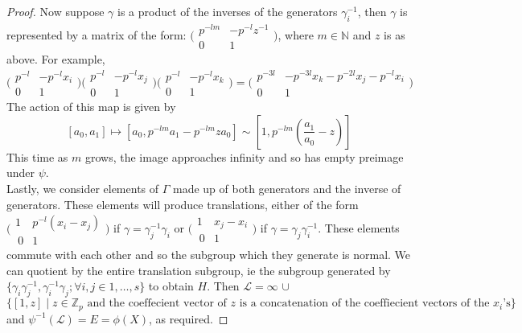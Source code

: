 \begin{proof}
Now suppose $\gamma$ is a product of the inverses of the generators $\gamma_i^{-1}$, then $\gamma$ is represented by a matrix of the form:  $\bigl( \begin{smallmatrix}p^{-lm} & -p^{-l}z^{-1}\\ 0 & 1 \end{smallmatrix}\bigr)$,  where $m \in \mathbb{N}$ and $z$ is as above. For example, 
\[\bigl( \begin{smallmatrix}p^{-l} & -p^{-l}x_i\\ 0 & 1 \end{smallmatrix}\bigr) \bigl( \begin{smallmatrix}p^{-l} & -p^{-l}x_j\\ 0 & 1 \end{smallmatrix}\bigr) \bigl( \begin{smallmatrix}p^{-l} & -p^{-l}x_k\\ 0 & 1 \end{smallmatrix}\bigr) = 
\bigl( \begin{smallmatrix}p^{-3l} & -p^{-3l}x_k - p^{-2l}x_j - p ^{-l}x_i\\ 0 & 1 \end{smallmatrix}\bigr)\]
The action of this map is given by \[[a_0,a_1] \mapsto [a_0, p^{-lm}a_1  -p^{-lm}za_0] \sim [1, p^{-lm}(\frac{a_1}{a_0}- z)]\]
This time as $m$ grows, the image approaches infinity and so has empty preimage under $\psi$.\\

Lastly, we consider elements of $\Gamma$ made up of both generators and the inverse of generators. These elements will produce translations, either of the form  $\bigl( \begin{smallmatrix}1 & p^{-l}(x_i-x_j)\\\ 0 & 1 \end{smallmatrix}\bigr)$ if $\gamma=
 \gamma_j^{-1} \gamma_i$ or $\bigl( \begin{smallmatrix}1 & x_j-x_i\\\ 0 & 1 \end{smallmatrix}\bigr)$ if $\gamma =  \gamma_j \gamma_i^{-1}$.
These elements commute with each other and so the subgroup which they generate is normal. We can quotient by the entire translation subgroup, ie the subgroup generated by $\{\gamma_i \gamma_j^{-1}, \gamma_i ^{-1} \gamma_j; \forall i,j \in 1,\ldots,s\}$ to obtain $H$. Then $\mathcal{L} = \infty$  $\cup$
$\{[1,z] \mid z \in \mathbb{Z}_p \text{ and the coeffecient vector of } z  \text{ is a concatenation of the coeffiecient vectors of the }x_i\text{'s}\}$
and $\psi^{-1}(\mathcal{L})=E=\phi(X)$, as required.



\end{proof}
 
